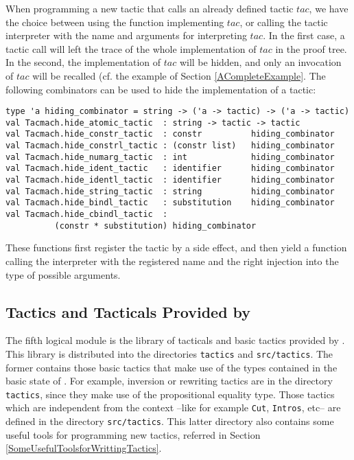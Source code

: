 When programming a new tactic that calls an already defined tactic
$tac$, we have the choice between using the \ocaml{} function
implementing $tac$, or calling the tactic interpreter with the name
and arguments for interpreting $tac$. In the first case, a tactic call
will left the trace of the whole implementation of $tac$ in the proof
tree. In the second, the implementation of $tac$ will be hidden, and
only an invocation of $tac$ will be recalled (cf. the example of
Section \ref{ACompleteExample}.  The following combinators can be used
to hide the implementation of a tactic:

\begin{verbatim}
type 'a hiding_combinator = string -> ('a -> tactic) -> ('a -> tactic)
val Tacmach.hide_atomic_tactic  : string -> tactic -> tactic
val Tacmach.hide_constr_tactic  : constr          hiding_combinator
val Tacmach.hide_constrl_tactic : (constr list)   hiding_combinator
val Tacmach.hide_numarg_tactic  : int             hiding_combinator
val Tacmach.hide_ident_tactic   : identifier      hiding_combinator
val Tacmach.hide_identl_tactic  : identifier      hiding_combinator
val Tacmach.hide_string_tactic  : string          hiding_combinator
val Tacmach.hide_bindl_tactic   : substitution    hiding_combinator
val Tacmach.hide_cbindl_tactic  : 
          (constr * substitution) hiding_combinator
\end{verbatim}

These functions first register the tactic by a side effect, and then
yield a function calling the interpreter with the registered name and
the right injection into the type of possible arguments.

\subsection{Tactics and Tacticals Provided by \Coq}

The fifth logical module is the library of tacticals and basic tactics
provided by \Coq. This library is distributed into the directories
\texttt{tactics} and \texttt{src/tactics}. The former contains those
basic tactics that make use of the types contained in the basic state
of \Coq. For example, inversion or rewriting tactics are in the
directory \texttt{tactics}, since they make use of the propositional
equality type.  Those tactics which are independent from the context
--like for example \texttt{Cut}, \texttt{Intros}, etc-- are defined in
the directory \texttt{src/tactics}. This latter directory also
contains some useful tools for programming new tactics, referred in 
Section \ref{SomeUsefulToolsforWrittingTactics}.

